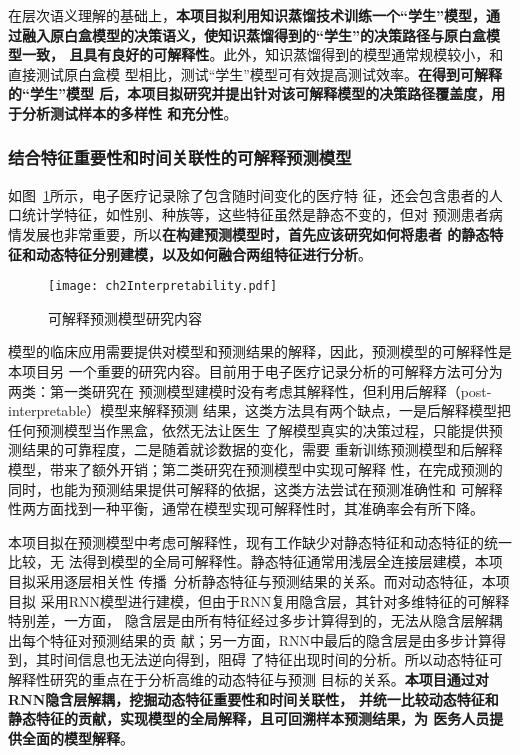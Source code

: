 在层次语义理解的基础上，\textbf{本项目拟利用知识蒸馏技术训练一个``学生''模型，通
过融入原白盒模型的决策语义，使知识蒸馏得到的``学生''的决策路径与原白盒模型一致，
且具有良好的可解释性}。此外，知识蒸馏得到的模型通常规模较小，和直接测试原白盒模
型相比，测试``学生''模型可有效提高测试效率。\textbf{在得到可解释的``学生''模型
后，本项目拟研究并提出针对该可解释模型的决策路径覆盖度，用于分析测试样本的多样性
和充分性}。


\subsubsection{结合特征重要性和时间关联性的可解释预测模型}

如图~\ref{fig:ch2:interpretability}所示，电子医疗记录除了包含随时间变化的医疗特
征，还会包含患者的人口统计学特征，如性别、种族等，这些特征虽然是静态不变的，但对
预测患者病情发展也非常重要，所以\textbf{在构建预测模型时，首先应该研究如何将患者
的静态特征和动态特征分别建模，以及如何融合两组特征进行分析}。

\begin{figure}
    \begin{small}
        \begin{center}
            \texttt{[image: ch2Interpretability.pdf]}
        \end{center}
        \caption{可解释预测模型研究内容}
        \label{fig:ch2:interpretability}
    \end{small}
\end{figure}

模型的临床应用需要提供对模型和预测结果的解释，因此，预测模型的可解释性是本项目另
一个重要的研究内容。目前用于电子医疗记录分析的可解释方法可分为两类：第一类研究在
预测模型建模时没有考虑其解释性，但利用后解释（post-interpretable）模型来解释预测
结果，这类方法具有两个缺点，一是后解释模型把任何预测模型当作黑盒，依然无法让医生
了解模型真实的决策过程，只能提供预测结果的可靠程度，二是随着就诊数据的变化，需要
重新训练预测模型和后解释模型，带来了额外开销；第二类研究在预测模型中实现可解释
性，在完成预测的同时，也能为预测结果提供可解释的依据，这类方法尝试在预测准确性和
可解释性两方面找到一种平衡，通常在模型实现可解释性时，其准确率会有所下降。

本项目拟在预测模型中考虑可解释性，现有工作缺少对静态特征和动态特征的统一比较，无
法得到模型的全局可解释性。静态特征通常用浅层全连接层建模，本项目拟采用逐层相关性
传播~分析静态特征与预测结果的关系。而对动态特征，本项目拟
采用RNN模型进行建模，但由于RNN复用隐含层，其针对多维特征的可解释特别差，一方面，
隐含层是由所有特征经过多步计算得到的，无法从隐含层解耦出每个特征对预测结果的贡
献；另一方面，RNN中最后的隐含层是由多步计算得到，其时间信息也无法逆向得到，阻碍
了特征出现时间的分析。所以动态特征可解释性研究的重点在于分析高维的动态特征与预测
目标的关系。\textbf{本项目通过对RNN隐含层解耦，挖掘动态特征重要性和时间关联性，
并统一比较动态特征和静态特征的贡献，实现模型的全局解释，且可回溯样本预测结果，为
医务人员提供全面的模型解释}。

